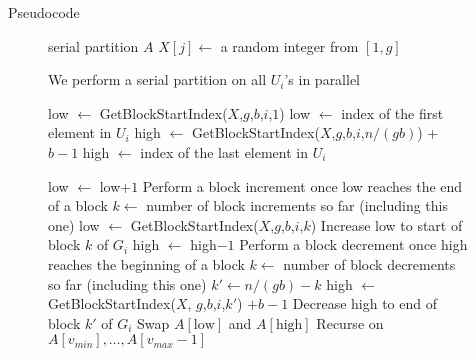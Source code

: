 \documentclass[table,serif,mathserif,final]{beamer}
\theoremstyle{remark}
\begin{document}
\begin{frame}{}
\begin{block}{\Huge Pseudocode}
\begin{figure}
\begin{algorithmic}
        \State serial partition $A$
      \Else
          \State $X[j] \gets$ a random integer from $[1,g]$ 
        \EndFor

         \Comment We perform a serial partition on all $U_i$'s in parallel

          \State low $\gets$ GetBlockStartIndex($X$,$g$,$b$,$i$,$1$)
          \Comment low $\gets$ index of the first element in $U_i$
          \State high $\gets$ GetBlockStartIndex($X$,$g$,$b$,$i$,$n/(gb)$) + $b-1$
          \Comment high $\gets$ index of the last element in $U_i$

              \State low $\gets$ low$+1$
                \Comment Perform a block increment once low reaches the end of a block
                \State $k \gets $ number of block increments so far (including this one)
                \State low $\gets$ GetBlockStartIndex($X$,$g$,$b$,$i$,$k$)
                \Comment Increase low to start of block $k$ of $G_i$
              \EndIf
            \EndWhile
              \State high $\gets$ high$-1$
                \Comment Perform a block decrement once high reaches the beginning of a block
                \State $k \gets $ number of block decrements so far (including this one)
                \State $k' \gets n/(gb) - k$
                \State high $\gets$ GetBlockStartIndex($X$, $g$,$b$,$i$,$k'$) $+b-1$
                \Comment Decrease high to end of block $k'$ of $G_i$
              \EndIf
            \EndWhile
            \State Swap $A[\text{low}]$ and $A[\text{high}]$
          \EndWhile
        \EndFor
        \State Recurse on $A[v_{min}],\ldots,A[v_{max}-1]$
      \EndIf
    \EndProcedure
  \end{algorithmic}	
\end{figure}

\end{block}

\end{frame}
\end{document}
